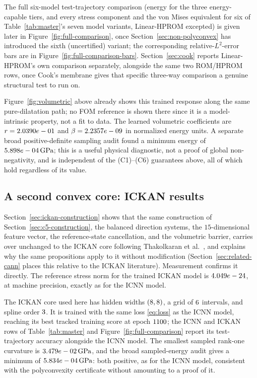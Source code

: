 \documentclass[10pt,a4paper]{article}
\begin{document}
The full six-model test-trajectory comparison (energy for the three
energy-capable tiers, and every stress component and the von Mises
equivalent for six of Table~\ref{tab:master}'s seven model variants,
Linear-HPROM excepted) is
given later in Figure~\ref{fig:full-comparison}, once
Section~\ref{sec:non-polyconvex} has introduced the sixth (uncertified)
variant; the corresponding relative-$L^2$-error bars are in
Figure~\ref{fig:full-comparison-bars}. Section~\ref{sec:cook} reports
Linear-HPROM's own comparison separately, alongside the same two
ROM/HPROM rows, once Cook's membrane gives that specific three-way
comparison a genuine structural test to run on.

Figure~\ref{fig:volumetric} above already shows this trained response
along the same pure-dilatation path; no FOM reference is shown there
since it is a model-intrinsic property, not a fit to data. The learned
volumetric coefficients are $r=2.0390e-01$ and
$\beta=2.2357e-09$ in normalized energy units. A separate
broad positive-definite sampling audit found a minimum energy of
$5.898e-04\,\mathrm{GPa}$; this is a useful physical diagnostic, not a
proof of global non-negativity, and is independent of the (C1)--(C6)
guarantees above, all of which hold regardless of its value.

\subsection{A second convex core: ICKAN results}
\label{sec:ickan}
Section~\ref{sec:ickan-construction} shows that the same construction of
Section~\ref{sec:c5-construction}, the balanced direction systems, the
$15$-dimensional feature vector, the reference-state cancellation, and
the volumetric barrier, carries over unchanged to the ICKAN core
following Thakolkaran et al.~\cite{Thakolkaran2025}, and explains why
the same propositions apply to it without modification
(Section~\ref{sec:related-cann} places this relative to the ICKAN
literature). Measurement confirms it directly. The reference stress
norm for the trained ICKAN model is $4.049e-24$, at
machine precision, exactly as for the ICNN model.

The ICKAN core used here has hidden widths $(8,8{})$, a
grid of $6{}$ intervals, and spline order $3{}$.
It is trained with the same loss \eqref{eq:loss} as the ICNN model,
reaching its best tracked training score at epoch $1100{}$;
the ICNN and ICKAN rows of Table~\ref{tab:master} and
Figure~\ref{fig:full-comparison} report its test-trajectory
accuracy alongside the ICNN model. The smallest sampled rank-one
curvature is $3.479e-02\,\mathrm{GPa}$, and the broad sampled-energy
audit gives a minimum of $5.834e-04\,\mathrm{GPa}$: both positive, as
for the ICNN model, consistent with the polyconvexity certificate
without amounting to a proof of it.
\end{document}
